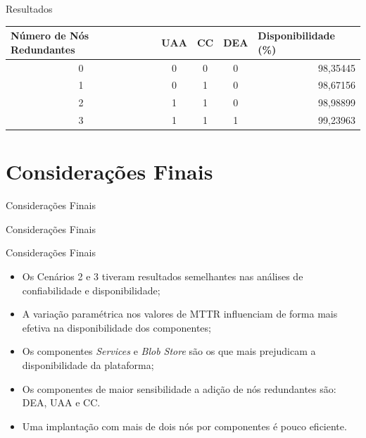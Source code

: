 \documentclass{beamer}
\begin{document}
    \begin{frame}{Resultados}

        \begin{table}[h]
        \centering
        \begin{tabular}{ccccr}
        \hline
        \multicolumn{1}{l}{Número de Nós Redundantes} & \multicolumn{1}{l}{UAA} & \multicolumn{1}{l}{CC} & \multicolumn{1}{l}{DEA} & \multicolumn{1}{l}{Disponibilidade (\%)} \\ \hline
        0                                             & 0                       & 0                      & 0                       & 98,35445                                \\
        1                                             & 0                       & 1                      & 0                       & 98,67156                                \\
        2                                             & 1                       & 1                      & 0                       & 98,98899                                \\
        3                                             & 1                       & 1                      & 1                       & 99,23963                                \\ \hline
        \end{tabular}
        \end{table}

    \end{frame}


\section{Considerações Finais}

    \begin{frame}{Considerações Finais}
        \Huge{\centerline{Considerações Finais}}
    \end{frame}
    
    \begin{frame}{Considerações Finais}

        \begin{itemize}
        \item Os Cenários 2 e 3 tiveram resultados semelhantes nas análises de confiabilidade e disponibilidade;
        \item A variação paramétrica nos valores de MTTR influenciam de forma mais efetiva na disponibilidade dos componentes;
        \item Os componentes \emph{Services} e \emph{Blob Store} são os que mais prejudicam a disponibilidade da plataforma;
        \item Os componentes de maior sensibilidade a adição de nós redundantes são: DEA, UAA e CC.
        \item Uma implantação com mais de dois nós por componentes é pouco eficiente.
        \end{itemize}

    \end{frame}
\end{document}
